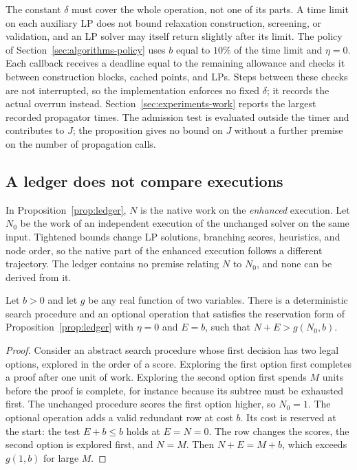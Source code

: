 The constant $\delta$ must cover the whole operation, not one of its parts. A
time limit on each auxiliary LP does not bound relaxation construction,
screening, or validation, and an LP solver may itself return slightly after its
limit. The policy of Section~\ref{sec:algorithms-policy} uses $b$ equal to
$10\%$ of the time limit and $\eta=0$. Each callback receives a deadline equal
to the remaining allowance and checks it between construction blocks, cached
points, and LPs. Steps between these checks are not interrupted, so the
implementation enforces no fixed $\delta$; it records the actual overrun
instead. Section~\ref{sec:experiments-work} reports the largest recorded
propagator times. The admission test is evaluated outside the timer and
contributes to $J$; the proposition gives no bound on $J$ without a further
premise on the number of propagation calls.

\subsection{A ledger does not compare executions}\label{sec:effort-comparison}

In Proposition~\ref{prop:ledger}, $N$ is the native work on the
\emph{enhanced} execution. Let $N_0$ be the work of an independent execution
of the unchanged solver on the same input. Tightened bounds change LP
solutions, branching scores, heuristics, and node order, so the native part of
the enhanced execution follows a different trajectory. The ledger contains no
premise relating $N$ to $N_0$, and none can be derived from it.

\begin{proposition}\label{prop:no-comparison}
Let $b>0$ and let $g$ be any real function of two variables. There is a
deterministic search procedure and an optional operation that satisfies the
reservation form of Proposition~\ref{prop:ledger} with $\eta=0$ and $E=b$, such
that $N+E>g(N_0,b)$.
\end{proposition}

\begin{proof}
Consider an abstract search procedure whose first decision has two legal
options, explored in the order of a score. Exploring the first option first
completes a proof after one unit of work. Exploring the second option first
spends $M$ units before the proof is complete, for instance because its subtree
must be exhausted first. The unchanged procedure scores the first option
higher, so $N_0=1$. The optional operation adds a valid redundant row at cost
$b$. Its cost is reserved at the start: the test $E+b\le b$ holds at $E=N=0$.
The row changes the scores, the second option is explored first, and $N=M$.
Then $N+E=M+b$, which exceeds $g(1,b)$ for large $M$.
\end{proof}

